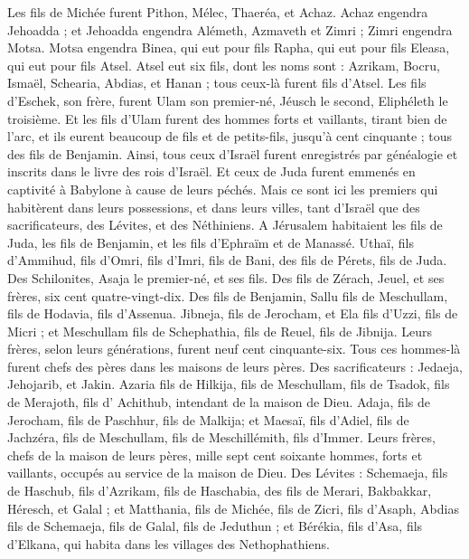 \begin{multicols}{2}
Les fils de Michée furent Pithon, Mélec, Thaeréa, et Achaz.
Achaz engendra Jehoadda ; et Jehoadda engendra Alémeth, Azmaveth et Zimri ; Zimri engendra Motsa.
Motsa engendra Binea, qui eut pour fils Rapha, qui eut pour fils Eleasa, qui eut pour fils Atsel.
Atsel eut six fils, dont les noms sont : Azrikam, Bocru, Ismaël, Schearia, Abdias, et Hanan ; tous ceux-là furent fils d'Atsel.
Les fils d'Eschek, son frère, furent  Ulam son premier-né, Jéusch le second, Eliphéleth le troisième.
Et les fils d'Ulam furent des hommes forts et vaillants, tirant bien de l'arc, et ils eurent beaucoup de fils et de petits-fils, jusqu'à cent cinquante ; tous des fils de Benjamin.
\VerseOne{}Ainsi, tous ceux d'Israël furent enregistrés par généalogie et inscrits dans le livre des rois d'Israël. Et ceux de Juda furent emmenés en captivité à Babylone à cause de leurs péchés.
Mais ce sont ici les premiers qui habitèrent dans leurs possessions, et dans leurs villes, tant d'Israël que des sacrificateurs, des Lévites, et des Néthiniens.
A Jérusalem habitaient les fils de Juda, les fils de Benjamin, et les fils d'Ephraïm et de Manassé.
Uthaï, fils d'Ammihud, fils d'Omri, fils d'Imri, fils de Bani, des fils de Pérets, fils de Juda.
Des Schilonites, Asaja le premier-né, et ses fils.
Des fils de Zérach, Jeuel, et ses frères, six cent quatre-vingt-dix.
Des fils de Benjamin, Sallu fils de Meschullam, fils de Hodavia, fils d'Assenua.
Jibneja, fils de Jerocham, et Ela fils d’Uzzi, fils de Micri ; et Meschullam fils de Schephathia, fils de Reuel, fils de Jibnija.
Leurs frères, selon leurs générations, furent neuf cent cinquante-six. Tous ces hommes-là furent chefs des pères dans les maisons de leurs  pères.
Des sacrificateurs : Jedaeja, Jehojarib, et Jakin.
Azaria fils de Hilkija, fils de Meschullam, fils de Tsadok, fils de Merajoth, fils d' Achithub, intendant de la maison de Dieu.
Adaja, fils de Jerocham, fils de Paschhur, fils de Malkija; et Maesaï, fils d'Adiel, fils de Jachzéra, fils de Meschullam, fils de Meschillémith, fils d'Immer.
Leurs frères, chefs de la maison de leurs pères, mille sept cent soixante hommes, forts et vaillants, occupés au service de la maison de Dieu.
Des Lévites : Schemaeja, fils de Haschub, fils d'Azrikam, fils de Haschabia, des fils de Merari,
Bakbakkar, Héresch, et Galal ; et Matthania, fils de Michée, fils de Zicri, fils d'Asaph,
Abdias fils de Schemaeja, fils de Galal, fils de Jeduthun ; et Bérékia, fils d'Asa, fils d'Elkana, qui habita dans les villages des Nethophathiens.

\end{multicols}
